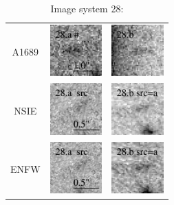 \documentclass[useAMS,usenatbib]{mn2e}
\begin{document}
\begin{table}
  \caption{Image system 28:}\vspace{0mm}
  \begin{tabular}{ccc}
    \multicolumn{1}{m{1cm}}{{\Large A1689}}
    & \multicolumn{1}{m{1.7cm}}{\includegraphics[height=2.00cm,clip]{figs/nsie_img/eA1689_F850LPa.img_28_a.ps}}
    & \multicolumn{1}{m{1.7cm}}{\includegraphics[height=2.00cm,clip]{figs/nsie_img/eA1689_F850LPa.img_28_b.ps}} \\
    \multicolumn{1}{m{1cm}}{{\Large NSIE}}
    & \multicolumn{1}{m{1.7cm}}{\includegraphics[height=2.00cm,clip]{figs/nsie_img/eA1689_F850LPa.src_28_a.ps}}
    & \multicolumn{1}{m{1.7cm}}{\includegraphics[height=2.00cm,clip]{figs/nsie_img/eA1689_F850LPa.pre_28_b_a_tri.ps}} \\
    \multicolumn{1}{m{1cm}}{{\Large ENFW}}
    & \multicolumn{1}{m{1.7cm}}{\includegraphics[height=2.00cm,clip]{figs/enfw_img/eA1689_F850LPa.src_28_a.ps}}
    & \multicolumn{1}{m{1.7cm}}{\includegraphics[height=2.00cm,clip]{figs/enfw_img/eA1689_F850LPa.pre_28_b_a_tri.ps}} \\
  \end{tabular}

\end{table}
\end{document}
